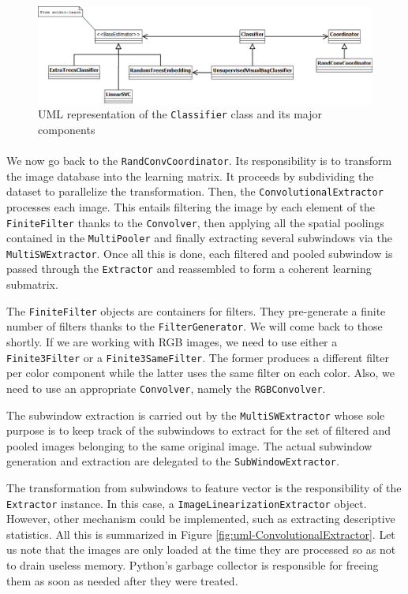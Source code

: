 \documentclass[a4paper]{report}
\begin{document}
		
		\begin{figure}
			\centering
				\includegraphics[width=1.00\textwidth]{images/uml-classifier.png}
			\caption{UML representation of the \texttt{Classifier} class and its major components}
			\label{fig:uml-classifier}
		\end{figure}
		
		
		\paragraph{}
		We now go back to the \texttt{RandConvCoordinator}. Its responsibility is to transform the image database into the learning matrix. It proceeds by subdividing the dataset to parallelize the transformation. Then, the \texttt{ConvolutionalExtractor} processes each image. This entails filtering the image by each element of the \texttt{FiniteFilter} thanks to the \texttt{Convolver}, then applying all the spatial poolings contained in the \texttt{MultiPooler} and finally extracting several subwindows via the \texttt{MultiSWExtractor}. Once all this is done, each filtered and pooled subwindow is passed through the \texttt{Extractor} and reassembled to form a coherent learning submatrix.
		\par
		The \texttt{FiniteFilter} objects are containers for filters. They pre-generate a finite number of filters thanks to the \texttt{FilterGenerator}. We will come back to those shortly. If we are working with RGB images, we need to use either a \texttt{Finite3Filter} or a \texttt{Finite3SameFilter}. The former produces a different filter per color component while the latter uses the same filter on each color. Also, we need to use an appropriate \texttt{Convolver}, namely the \texttt{RGBConvolver}.
		\par
		The subwindow extraction is carried out by the \texttt{MultiSWExtractor} whose sole purpose is to keep track of the subwindows to extract for the set of filtered and pooled images belonging to the same original image. The actual subwindow generation and extraction are delegated to the \texttt{SubWindowExtractor}.
		\par
		The transformation from subwindows to feature vector is the responsibility of the \texttt{Extractor} instance. In this case, a \texttt{ImageLinearizationExtractor} object. However, other mechanism could be implemented, such as extracting descriptive statistics.
		All this is summarized in Figure \ref{fig:uml-ConvolutionalExtractor}. Let us note that the images are only loaded at the time they are processed so as not to drain useless memory. Python's garbage collector is responsible for freeing them as soon as needed after they were treated.
		
\end{document}
